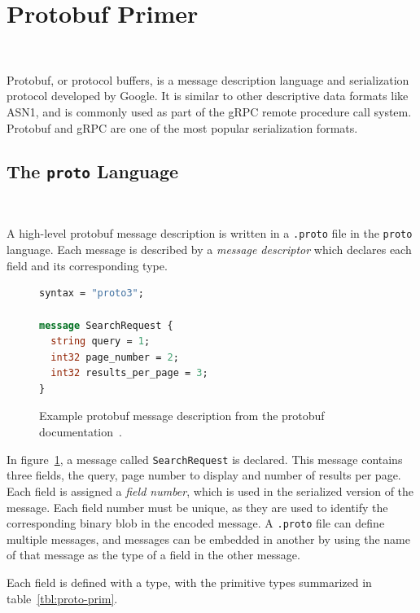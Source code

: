 \section{Protobuf Primer}~\label{sec:proto}

Protobuf, or protocol buffers, is a message description language and
serialization protocol developed by Google. It is similar to other descriptive
data formats like ASN1, and is commonly used as part of the gRPC remote
procedure call system. Protobuf and gRPC are one of the most popular
serialization formats.

\subsection{The \texttt{proto} Language}~\label{sec:proto-lang}

A high-level protobuf message description is written in a \texttt{.proto} file
in the \texttt{proto} language. Each message is described by a \emph{message
	descriptor} which declares each field and its corresponding type.

\begin{figure}[H]
	\begin{lstlisting}[language=proto]
syntax = "proto3";

message SearchRequest {
  string query = 1;
  int32 page_number = 2;
  int32 results_per_page = 3;
}\end{lstlisting}

	\caption{Example protobuf message description from the protobuf documentation~\cite{LanguageGuideProto}.}
	\label{fig:proto-ex}
\end{figure}

In figure~\ref{fig:proto-ex}, a message called \texttt{SearchRequest} is
declared. This message contains three fields, the query, page number to display
and number of results per page. Each field is assigned a \emph{field number},
which is used in the serialized version of the message. Each field number must
be unique, as they are used to identify the corresponding binary blob in the
encoded message. A \texttt{.proto} file can define multiple messages, and
messages can be embedded in another by using the name of that message as the
type of a field in the other message.

Each field is defined with a type, with the primitive types summarized in
table~\ref{tbl:proto-prim}.

